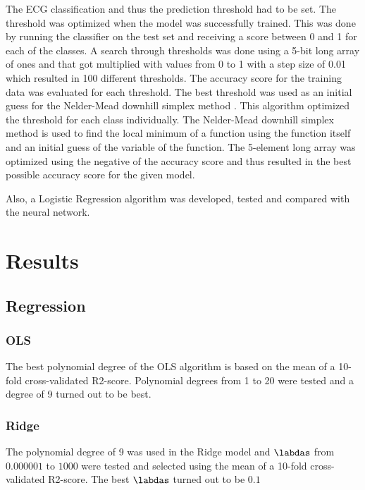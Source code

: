 \documentclass[twocolumn]{cinc}
\begin{document}
The ECG classification and thus the prediction threshold had to be set. The threshold was optimized when the model was successfully trained. This was done by running the classifier on the test set and receiving a score between 0 and 1 for each of the classes. A search through thresholds was done using a 5-bit long array of ones and that got multiplied with values from 0 to 1 with a step size of 0.01 which resulted in 100 different thresholds. The accuracy score for the training data was evaluated for each threshold. The best threshold was used as an initial guess for the Nelder-Mead downhill simplex method \cite{nelder_simplex_1965, virtanen_scipy_2020}. This algorithm optimized the threshold for each class individually. The Nelder-Mead downhill simplex method is used to find the local minimum of a function using the function itself and an initial guess of the variable of the function. The 5-element long array was optimized using the negative of the accuracy score and thus resulted in the best possible accuracy score for the given model.

Also, a Logistic Regression algorithm was developed, tested and compared with the neural network.


\section{Results}
\subsection{Regression}
\subsubsection{OLS}
The best polynomial degree of the OLS algorithm is based on the mean of a 10-fold cross-validated R2-score. Polynomial degrees from 1 to 20 were tested and a degree of 9 turned out to be best.
\subsubsection{Ridge}
The polynomial degree of 9 was used in the Ridge model and $\labdas$ from $0.000001$ to $1000$ were tested and selected using the mean of a 10-fold cross-validated R2-score. The best $\labdas$ turned out to be $0.1$
\end{document}
